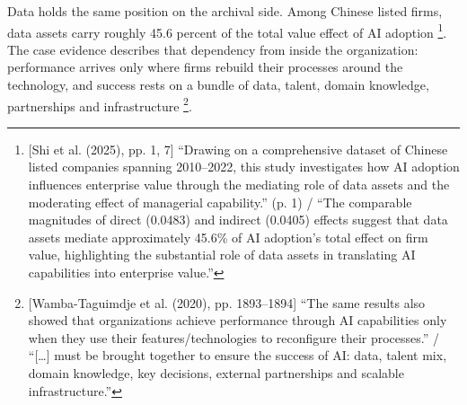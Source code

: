 Data holds the same position on the archival side. Among Chinese listed firms, data assets carry roughly 45.6 percent of the total value effect of AI adoption \parencite[p.~7]{shi2025value}\footnote{[Shi et al. (2025), pp. 1, 7] ``Drawing on a comprehensive dataset of Chinese listed companies spanning 2010--2022, this study investigates how AI adoption influences enterprise value through the mediating role of data assets and the moderating effect of managerial capability.'' (p. 1) / ``The comparable magnitudes of direct (0.0483) and indirect (0.0405) effects suggest that data assets mediate approximately 45.6\% of AI adoption's total effect on firm value, highlighting the substantial role of data assets in translating AI capabilities into enterprise value.''}. The case evidence describes that dependency from inside the organization: performance arrives only where firms rebuild their processes around the technology, and success rests on a bundle of data, talent, domain knowledge, partnerships and infrastructure \parencite[pp.~1893--1894]{wambataguimdje2020influence}\footnote{[Wamba-Taguimdje et al. (2020), pp. 1893--1894] ``The same results also showed that organizations achieve performance through AI capabilities only when they use their features/technologies to reconfigure their processes.'' / ``[\dots] must be brought together to ensure the success of AI: data, talent mix, domain knowledge, key decisions, external partnerships and scalable infrastructure.''}.

